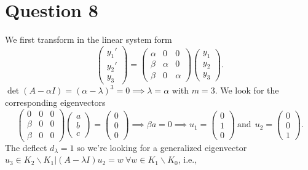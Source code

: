 \documentclass[
	12pt,
	]{article}
\theoremstyle{definition}
\theoremstyle{definition}
\theoremstyle{definition}
\theoremstyle{definition}
\theoremstyle{definition}
\theoremstyle{example}
\theoremstyle{note}
\theoremstyle{remark}
\theoremstyle{example}
\begin{document}
			\section*{Question 8}
				We first transform in the linear system form 
				\begin{equation}
					\begin{pmatrix}
						y_{1}' \\ y_{2}' \\ y_{3} \ 
					\end{pmatrix}
					= \begin{pmatrix}
						\alpha & 0 & 0 \\ \beta & \alpha & 0 \\ \beta & 0 & \alpha
					\end{pmatrix}
					\begin{pmatrix}
						y_{1} \\ y_{2} \\ y_{3}
					\end{pmatrix}.
				\end{equation}
				$\det(A - \alpha I) = (\alpha - \lambda)^{3} = 0 \implies \lambda = \alpha $ with $m=3$. We look for the corresponding eigenvectors
				$$\begin{pmatrix}
						0 & 0 & 0 \\ \beta & 0 & 0 \\ \beta & 0 & 0
					\end{pmatrix}
					\begin{pmatrix}
						a \\ b \\ c
					\end{pmatrix} = 
					\begin{pmatrix}
					0 \\ 0 \\ 0
					\end{pmatrix} \implies \beta a = 0 \implies u_{1} = \begin{pmatrix}
						0 \\ 1 \\ 0
					\end{pmatrix} \ \text{and} \ \ u_{2} = \begin{pmatrix}
						0 \\ 0 \\ 1
					\end{pmatrix}.$$
				The deflect $d_{\lambda} = 1$ so we're looking for a generalized eigenvector $u_{3} \in K_{2} \backslash K_{1} | (A - \lambda I )u_{2} =w \ \forall w \in K_{1} \backslash K_{0}$, i.e.,
\end{document}
